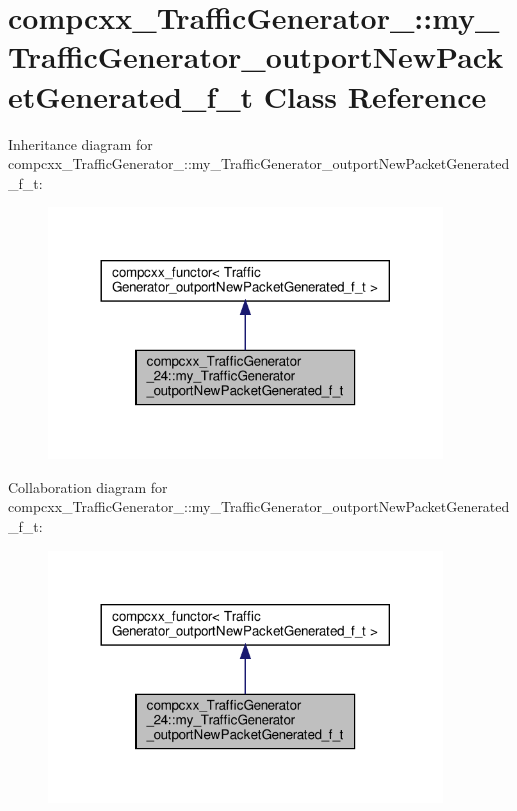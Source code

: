 \hypertarget{classcompcxx__TrafficGenerator__24_1_1my__TrafficGenerator__outportNewPacketGenerated__f__t}{}\section{compcxx\+\_\+\+Traffic\+Generator\+\_\+:\+:my\+\_\+\+Traffic\+Generator\+\_\+outport\+New\+Packet\+Generated\+\_\+f\+\_\+t Class Reference}
\label{classcompcxx__TrafficGenerator__24_1_1my__TrafficGenerator__outportNewPacketGenerated__f__t}


Inheritance diagram for compcxx\+\_\+\+Traffic\+Generator\+\_\+:\+:my\+\_\+\+Traffic\+Generator\+\_\+outport\+New\+Packet\+Generated\+\_\+f\+\_\+t\+:\nopagebreak
\begin{figure}[H]
\begin{center}
\leavevmode
\includegraphics[width=296pt]{classcompcxx__TrafficGenerator__24_1_1my__TrafficGenerator__outportNewPacketGenerated__f__t__inherit__graph}
\end{center}
\end{figure}


Collaboration diagram for compcxx\+\_\+\+Traffic\+Generator\+\_\+:\+:my\+\_\+\+Traffic\+Generator\+\_\+outport\+New\+Packet\+Generated\+\_\+f\+\_\+t\+:\nopagebreak
\begin{figure}[H]
\begin{center}
\leavevmode
\includegraphics[width=296pt]{classcompcxx__TrafficGenerator__24_1_1my__TrafficGenerator__outportNewPacketGenerated__f__t__coll__graph}
\end{center}
\end{figure}
